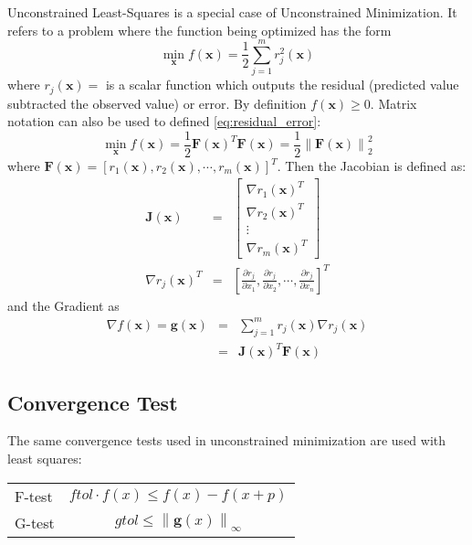 \documentclass[peerreview,compsoc,onecolumn]{IEEEtran}
\newcommand{\norm}[1]{\left\lVert#1\right\rVert}
\begin{document}
Unconstrained Least-Squares is a special case of Unconstrained Minimization. It refers to a problem where the function being optimized has the form
\begin{equation}
\label{eq:residual_error}
\min\limits_{\bm{x}} f(\bm{x})=\frac{1}{2}\sum^m_{j=1} r^2_j(\bm{x})
\end{equation}
where $r_j(\bm{x}) = $ is a scalar function which outputs the residual (predicted value subtracted the observed value) or error. By definition $f(\bm{x}) \ge 0$. Matrix notation can also be used to defined \ref{eq:residual_error}:
\begin{equation}
\min\limits_{\bm{x}} f(\bm{x}) =\frac{1}{2} \bm{F}(\bm{x})^T \bm{F}(\bm{x}) = \frac{1}{2} \norm{\bm{F}(\bm{x})}^2_2
\end{equation}
where $\bm{F}(\bm{x}) = [ r_1(\bm{x}) , r_2(\bm{x}) , \cdots , r_m(\bm{x}) ]^T$. Then the Jacobian is defined as:
\begin{eqnarray}
\bm{J}(\bm{x}) &=&  \left[ \begin{array}{c}\nabla r_1(\bm{x})^T \\ \nabla r_2(\bm{x})^T \\ \vdots \\ \nabla r_m(\bm{x})^T \end{array}\right] \\
\nabla r_j(\bm{x})^T &=& \left[ \frac{\partial r_j}{\partial x_1},\frac{\partial r_j}{\partial x_2}, \cdots , \frac{\partial r_j}{\partial x_n} \right]^T
\end{eqnarray}
and the Gradient as
\begin{eqnarray}
\nabla f(\bm{x}) = \bm{g}(\bm{x}) &=& \sum^m_{j=1}r_j(\bm{x})\nabla r_j(\bm{x}) \\
&=& \bm{J}(\bm{x})^T \bm{F}(\bm{x})
\end{eqnarray}

\subsection{Convergence Test}

The same convergence tests used in unconstrained minimization are used with least squares:
\begin{center}
\begin{tabular}{lc}
F-test & $ftol \cdot f(x)  \leq f(x) - f(x+p)$ \\
G-test & $gtol \leq \norm{\bm{g}(x)}_\infty$ \\
\end{tabular}
\end{center}
\end{document}
